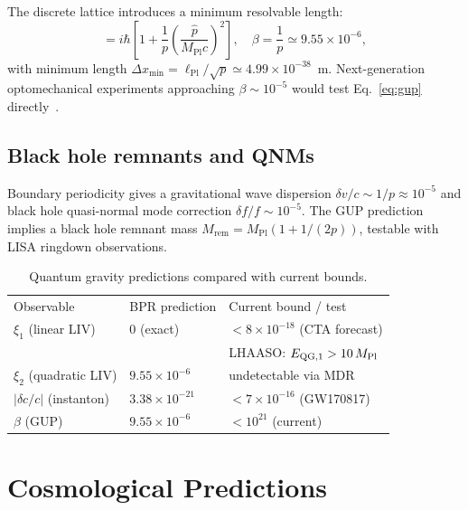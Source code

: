 \documentclass[aps,prd,twocolumn,superscriptaddress,longbibliography,nofootinbib]{revtex4-2}
\newcommand{\MPl}{M_{\mathrm{Pl}}}
\newcommand{\lP}{\ell_{\mathrm{Pl}}}
\begin{document}
The discrete lattice introduces a minimum resolvable length:
\begin{equation}
[\hat{x},\hat{p}] = i\hbar\left[1 + \frac{1}{p}\left(\frac{\hat{p}}{\MPl c}\right)^2\right],
\quad \beta = \frac{1}{p} \simeq 9.55 \times 10^{-6},
\label{eq:gup}
\end{equation}
with minimum length $\Delta x_{\min} = \lP/\!\sqrt{p} \simeq 4.99\times10^{-38}$~m.
Next-generation optomechanical experiments approaching $\beta \sim 10^{-5}$
would test Eq.~\eqref{eq:gup} directly~\cite{Bawaj2015}.

\subsection{Black hole remnants and QNMs}

Boundary periodicity gives a gravitational wave dispersion
$\delta v/c \sim 1/p \approx 10^{-5}$ and black hole quasi-normal mode
correction $\delta f/f \sim 10^{-5}$.  The GUP prediction implies a
black hole remnant mass $M_{\mathrm{rem}} = \MPl(1 + 1/(2p))$, testable
with LISA ringdown observations.

\begin{table}[h]
\caption{Quantum gravity predictions compared with current bounds.}
\label{tab:qg}
\begin{ruledtabular}
\begin{tabular}{lll}
Observable & BPR prediction & Current bound / test \\
\colrule
$\xi_1$ (linear LIV) & $0$ (exact) &  $<8\times10^{-18}$ (CTA forecast) \\
                      &              & LHAASO: $E_{\rm QG,1}>10\,\MPl$ \\
$\xi_2$ (quadratic LIV) & $9.55\times10^{-6}$ & undetectable via MDR \\
$|\delta c/c|$ (instanton) & $3.38\times10^{-21}$ & $<7\times10^{-16}$ (GW170817) \\
$\beta$ (GUP) & $9.55\times10^{-6}$ & $<10^{21}$ (current) \\
\end{tabular}
\end{ruledtabular}
\end{table}


\section{Cosmological Predictions}
\label{sec:cosmo}
\end{document}
